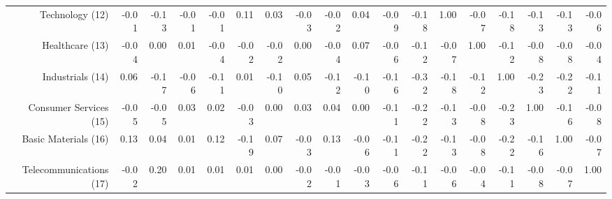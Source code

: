 \begin{sidewaystable}
{\begin{tabular}{rrrrrrrrrrrrrrrrrr}
Technology (12)         & -0.01 & -0.13 & -0.01 & -0.01 & 0.11  & 0.03  & -0.03 & -0.02 & 0.04  & -0.09 & -0.18 & 1.00  & -0.07 & -0.18 & -0.13 & -0.13 & -0.06 \\
Healthcare (13)         & -0.04 & 0.00  & 0.01  & -0.04 & -0.02 & -0.02 & 0.00  & -0.04 & 0.07  & -0.06 & -0.12 & -0.07 & 1.00  & -0.12 & -0.08 & -0.08 & -0.04 \\
Industrials (14)        & 0.06  & -0.17 & -0.06 & -0.11 & 0.01  & -0.10 & 0.05  & -0.12 & -0.10 & -0.16 & -0.32 & -0.18 & -0.12 & 1.00  & -0.23 & -0.22 & -0.11 \\
Consumer Services (15)  & -0.05 & -0.05 & 0.03  & 0.02  & -0.03 & 0.00  & 0.03  & 0.04  & 0.00  & -0.11 & -0.22 & -0.13 & -0.08 & -0.23 & 1.00  & -0.16 & -0.08 \\
Basic Materials (16)    & 0.13  & 0.04  & 0.01  & 0.12  & -0.19 & 0.07  & -0.03 & 0.13  & -0.06 & -0.11 & -0.22 & -0.13 & -0.08 & -0.22 & -0.16 & 1.00  & -0.07 \\
Telecommunications (17) & -0.02 & 0.20  & 0.01  & 0.01  & 0.01  & 0.00  & -0.02 & -0.01 & -0.03 & -0.06 & -0.11 & -0.06 & -0.04 & -0.11 & -0.08 & -0.07 & 1.00
           \\ 
   \bottomrule
\end{tabular}}
\end{sidewaystable}
